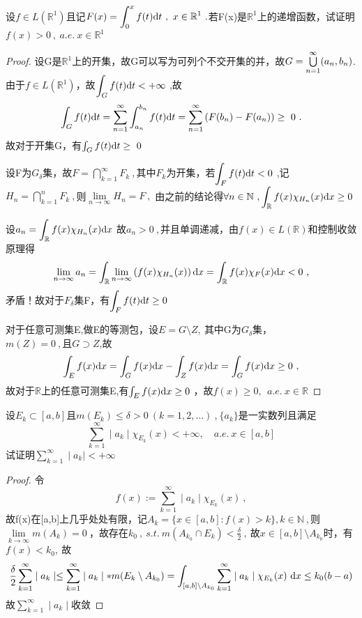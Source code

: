 设$f\in L(\mathbb{R}^1)$且记$F(x)=\displaystyle{\int_{0}^{x}f(t)\di{t}}\ ,\ x \in \mathbb{R}^1\ .$若F(x)是$\mathbb{R}^1$上的递增函数，试证明$f(x)>0\ ,\ a.e.\ x \in \mathbb{R}^1$
\begin{proof}
设G是$\mathbb{R}^1$上的开集，故G可以写为可列个不交开集的并，故$G=\bigcup\limits\limits_{n=1}^{\infty}(a_n,b_n)$.由于$f\in L(\mathbb{R}^1)$，故$\displaystyle{\int_Gf(t)\di{t}}<+\infty\ $,故$$\int_Gf(t)\mathrm{d}t=\sum_{n=1}^{\infty}\int_{a_n}^{b_n}f(t)\mathrm{d}t=\sum_{n=1}^{\infty}\left(F(b_n)-F(a_n)\right)\geq \ 0 \ .$$
故对于开集G，有$\int_Gf(t)\mathrm{d}t\geq\ 0$\par 
设F为$G_{\delta}$集，故$F=\bigcap\limits_{k=1}^{\infty}F_k\ ,$其中$F_k$为开集，若$\displaystyle{\int_Ff(t)\di{t}<0}\ $,记$H_n=\bigcap\limits_{k=1}^{n}F_k\ ,$则$\lim\limits_{n\to\infty}H_n=F\ ,$ 由之前的结论得$\forall n\in \mathbb{N}\ , \displaystyle{\int_{\mathbb{R}}f(x)\chi_{H_n}(x)\mathrm{d}x}\geq0$ \par
设$a_n=\displaystyle{\int_{\mathbb{R}}f(x)\chi_{H_n}(x)\di{x}}\ $故$a_n>0\ ,$并且单调递减，由$f(x)\in  L(\mathbb{R})$和控制收敛原理得$$\lim\limits_{n\to\infty}a_n=\int_{\mathbb{R}}\lim\limits_{n\to\infty}\left(f(x)\chi_{H_n}(x)\right)\di{x}=\int_{\mathbb{R}}f(x)\chi_{F}(x)\di{x}<0\ ,$$矛盾！故对于$F_{\delta}$集F，有$\displaystyle{\int_Ff(t)\mathrm{d}t}\geq0\ $\par 
对于任意可测集E,做E的等测包，设$E=G\setminus Z,\ $其中G为$G_{\delta}$集，$m(Z)=0\ ,且G \supset Z$,故$$\int_E f(x)\di{x}=\int_G f(x)\di{x}-\int_Z f(x)\di{x}=\int_G f(x)\di{x}\geq0\ ,$$故对于$\mathbb{R}$上的任意可测集E,有$\int_E f(x)\di{x}\geq0\ $，故$f(x)\geq0,\ \ a.e.\ x \in \mathbb{R}$
\end{proof}


设$E_k \subset[a,b]$且$m(E_k)\leq \delta >0\ (k=1,2,...)\ $,$\ \{a_k\}$是一实数列且满足$$\sum_{k=1}^{\infty}\mid a_k\mid \chi_{E_k}(x)<+\infty,\quad a.e.\ x\in [a,b]$$试证明$\sum\limits_{k=1}^{\infty}\mid a_k\mid <+\infty$
\begin{proof}
	令$$f(x):=\sum_{k=1}^{\infty}\mid a_k\mid \chi_{E_k}(x)\ , $$故f(x)在[a,b]上几乎处处有限，记$A_k=\{x\in[a,b]:f(x)>k\},k \in \mathbb{N}\ ,$则$\lim\limits_{k\to\infty}m(A_k)=0\ ，$故存在$k_0\ ,\ s.t.\ m(A_{k_0}\cap E_k)<\frac{\delta}{2}\ ,\ $故$x\in [a,b]\setminus A_{k_0}$时，有$f(x)<k_0,\ $故$$\frac{\delta}{2}\sum_{k=1}^{\infty}\mid a_k\mid \leq \sum_{k=1}^{\infty}\mid a_k\mid *m(E_k\setminus A_{k_0})=\int_{[a,b]\setminus A_{k_0}} \sum_{k=1}^{\infty}\mid a_k\mid\chi_{E_k}(x)\ \mathrm{d}x\leq k_0(b-a)$$
	故$\sum_{k=1}^{\infty}\mid a_k\mid$收敛
\end{proof}


